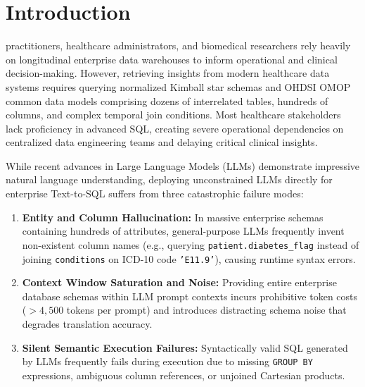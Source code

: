 \documentclass[10pt,journal,compsoc]{IEEEtran}
\begin{document}
\section{Introduction}
 practitioners, healthcare administrators, and biomedical researchers rely heavily on longitudinal enterprise data warehouses to inform operational and clinical decision-making. However, retrieving insights from modern healthcare data systems requires querying normalized Kimball star schemas and OHDSI OMOP common data models comprising dozens of interrelated tables, hundreds of columns, and complex temporal join conditions. Most healthcare stakeholders lack proficiency in advanced SQL, creating severe operational dependencies on centralized data engineering teams and delaying critical clinical insights.

While recent advances in Large Language Models (LLMs) demonstrate impressive natural language understanding, deploying unconstrained LLMs directly for enterprise Text-to-SQL suffers from three catastrophic failure modes:
\begin{enumerate}
    \item \textbf{Entity and Column Hallucination:} In massive enterprise schemas containing hundreds of attributes, general-purpose LLMs frequently invent non-existent column names (e.g., querying \texttt{patient.diabetes\_flag} instead of joining \texttt{conditions} on ICD-10 code \texttt{'E11.9'}), causing runtime syntax errors.
    \item \textbf{Context Window Saturation and Noise:} Providing entire enterprise database schemas within LLM prompt contexts incurs prohibitive token costs ($> 4,500$ tokens per prompt) and introduces distracting schema noise that degrades translation accuracy.
    \item \textbf{Silent Semantic Execution Failures:} Syntactically valid SQL generated by LLMs frequently fails during execution due to missing \texttt{GROUP BY} expressions, ambiguous column references, or unjoined Cartesian products.
\end{enumerate}
\end{document}
